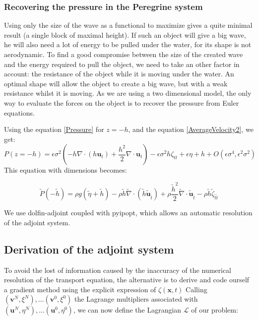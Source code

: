 \documentclass[11pt,a4paper]{article}
\begin{document}
\subsubsection{Recovering the pressure in the Peregrine system}		
	Using only the size of the wave as a functional to maximize gives a quite minimal result (a single block of maximal height). If such an object will give a big wave, he will also need a lot of energy to be pulled under the water, for its shape is not aerodynamic. To find a good compromise between the size of the created wave and the energy required to pull the object, we need to take an other factor in account: the resistance of the object while it is moving under the water. An optimal shape will allow the object to create a big wave, but with a weak resistance whilst it is moving. As we are using a two dimensional model, the only way to evaluate the forces on the object is to recover the pressure from Euler equations.
				
				Using the equation \eqref{Pressure} for $ z = -h$, and the equation \eqref{AverageVelocity2}, we get:
			\begin{equation}
				P(z=-h) = \epsilon \sigma^2(-h\nabla \cdot (h \mathbf{u}_t) + \frac{h^2}{2} \nabla \cdot \mathbf{u}_t) - \epsilon \sigma^2 h \zeta_{tt} + \epsilon \eta + h + O(\epsilon\sigma^4, \epsilon^2 \sigma^2)
			\end{equation}			
			This equation with dimensions becomes:
			
			\begin{equation}
				\tilde{P}(-\tilde{h}) = \rho g (\tilde{\eta} + \tilde{h} ) - \rho \tilde h \tilde {\nabla} \cdot (\tilde h \tilde{\mathbf{u}}_{\tilde t}) + \rho \frac{\tilde h^2}{2} \tilde \nabla \cdot \tilde{\mathbf{u}}_{\tilde t} - \rho \tilde h \tilde \zeta_{\tilde t \tilde t}
			\end{equation}
					

					We use dolfin-adjoint coupled with pyipopt, which allows an automatic resolution of the adjoint system.
					
					
					
					

\subsection{Derivation of the adjoint system}
	To avoid the lost of information caused by the inaccuracy of the numerical resolution of the transport equation, the alternative is to derive and code ourself a gradient method using the explicit expression of $\zeta(\mathbf{x},t)$
	Calling $(\mathbf{v}^N, \xi^N), ... (\mathbf{v}^0, \xi^0)$ the Lagrange multipliers associated with $(\mathbf{u}^N, \eta^N), ... (\mathbf{u}^0, \eta^0)$, we can now define the Lagrangian $\mathcal{L} $ of our problem: 
		
\end{document}
